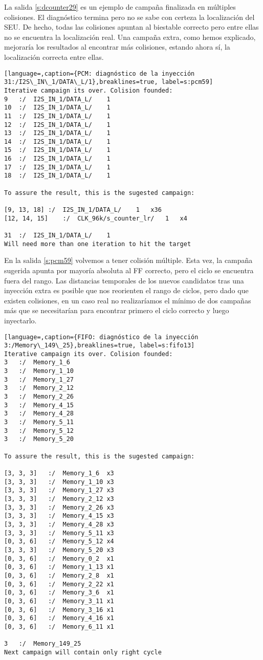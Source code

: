 La salida \ref{s:dcounter29} es un ejemplo de campaña finalizada en múltiples
colisiones. El diagnóstico termina pero no se sabe con certeza la localización del
\gls{SEU}. De hecho, todas las colisiones apuntan al biestable correcto pero entre
ellas no se encuentra la localización real. Una campaña extra, como hemos
explicado, mejoraría los resultados al encontrar más colisiones, estando ahora sí,
la localización correcta entre ellas.

\begin{lstlisting}[language=,caption={PCM: diagnóstico de la inyección
31:/I2S\_IN\_1/DATA\_L/1},breaklines=true, label=s:pcm59]
Iterative campaign its over. Colision founded:
9	:/	I2S_IN_1/DATA_L/	1
10	:/	I2S_IN_1/DATA_L/	1
11	:/	I2S_IN_1/DATA_L/	1
12	:/	I2S_IN_1/DATA_L/	1
13	:/	I2S_IN_1/DATA_L/	1
14	:/	I2S_IN_1/DATA_L/	1
15	:/	I2S_IN_1/DATA_L/	1
16	:/	I2S_IN_1/DATA_L/	1
17	:/	I2S_IN_1/DATA_L/	1
18	:/	I2S_IN_1/DATA_L/	1

To assure the result, this is the sugested campaign:

[9, 13, 18]	:/	I2S_IN_1/DATA_L/	1	x36
[12, 14, 15]	:/	CLK_96k/s_counter_lr/	1	x4

31	:/	I2S_IN_1/DATA_L/	1
Will need more than one iteration to hit the target
\end{lstlisting}

En la salida \ref{s:pcm59} volvemos a tener colisión múltiple. Esta vez, la 
campaña sugerida apunta por mayoría absoluta al FF correcto, pero el ciclo se 
encuentra fuera del rango. Las distancias temporales de los nuevos candidatos tras
una inyección extra es posible que nos reorienten el rango de ciclos, pero dado 
que existen colisiones, en un caso real no realizaríamos el mínimo de dos campañas
más que se necesitarían para encontrar primero el ciclo correcto y luego
inyectarlo.

\begin{lstlisting}[language=,caption={FIFO: diagnóstico de la inyección
3:/Memory\_149\_25},breaklines=true, label=s:fifo13]
Iterative campaign its over. Colision founded:
3	:/	Memory_1_6
3	:/	Memory_1_10
3	:/	Memory_1_27
3	:/	Memory_2_12
3	:/	Memory_2_26
3	:/	Memory_4_15
3	:/	Memory_4_28
3	:/	Memory_5_11
3	:/	Memory_5_12
3	:/	Memory_5_20

To assure the result, this is the sugested campaign:

[3, 3, 3]	:/	Memory_1_6	x3
[3, 3, 3]	:/	Memory_1_10	x3
[3, 3, 3]	:/	Memory_1_27	x3
[3, 3, 3]	:/	Memory_2_12	x3
[3, 3, 3]	:/	Memory_2_26	x3
[3, 3, 3]	:/	Memory_4_15	x3
[3, 3, 3]	:/	Memory_4_28	x3
[3, 3, 3]	:/	Memory_5_11	x3
[0, 3, 6]	:/	Memory_5_12	x4
[3, 3, 3]	:/	Memory_5_20	x3
[0, 3, 6]	:/	Memory_0_2	x1
[0, 3, 6]	:/	Memory_1_13	x1
[0, 3, 6]	:/	Memory_2_8	x1
[0, 3, 6]	:/	Memory_2_22	x1
[0, 3, 6]	:/	Memory_3_6	x1
[0, 3, 6]	:/	Memory_3_11	x1
[0, 3, 6]	:/	Memory_3_16	x1
[0, 3, 6]	:/	Memory_4_16	x1
[0, 3, 6]	:/	Memory_6_11	x1

3	:/	Memory_149_25
Next campaign will contain only right cycle
\end{lstlisting}

